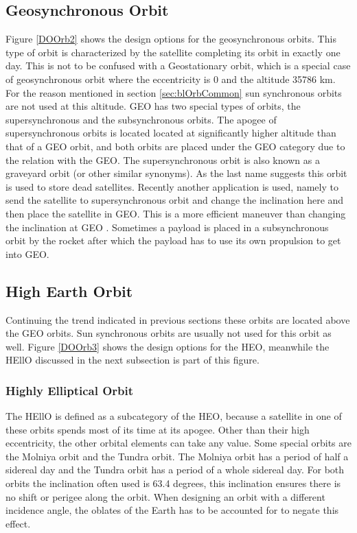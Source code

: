\subsection{Geosynchronous Orbit}
\label{sec:blOrb3}
Figure \ref{DOOrb2} shows the design options for the geosynchronous orbits.
This type of orbit is characterized by the satellite completing its orbit in exactly one day. This is not to be confused with a Geostationary orbit, which is a special case of geosynchronous orbit where the eccentricity is 0 and the altitude 35786 km.
For the reason mentioned in section \ref{sec:blOrbCommon} sun synchronous orbits are not used at this altitude. \acs{GEO} has two special types of orbits, the supersynchronous and the subsynchronous orbits. 
The apogee of supersynchronous orbits is located located at significantly higher altitude than that of a \acs{GEO} orbit, and both orbits are placed under the \acs{GEO} category due to the relation with the \acs{GEO}. The supersynchronous orbit is also known as a graveyard orbit (or other similar synonyms). As the last name suggests this orbit is used to store dead satellites. Recently another application is used, namely to send the satellite to supersynchronous orbit and change the inclination here and then place the satellite in \acs{GEO}. This is a more efficient maneuver than changing the inclination at \acs{GEO} \cite{jerOrbit}. 
Sometimes a payload is placed in a subsynchronous orbit by the rocket after which the payload has to use its own propulsion to get into \acs{GEO}.

\subsection{High Earth Orbit}
\label{sec:blOrb4}
Continuing the trend indicated in previous sections these orbits are located above the \acs{GEO} orbits. Sun synchronous orbits are usually not used for this orbit as well. 
Figure \ref{DOOrb3} shows the design options for the \ac{HEO}, meanwhile the \acs{HEllO} discussed in the next subsection is part of this figure.

\subsubsection{Highly Elliptical Orbit}
\label{sec:blOrb4.5}
The \ac{HEllO} is defined as a subcategory of the \acs{HEO}, because a satellite in one of these orbits spends most of its time at its apogee. Other than their high eccentricity, the other orbital elements can take any value. Some special orbits are the Molniya orbit and the Tundra orbit. The Molniya orbit has a period of half a sidereal day and the Tundra orbit has a period of a whole sidereal day. For both orbits the inclination often used is 63.4 degrees, this inclination ensures there is no shift or perigee along the orbit. When designing an orbit with a different incidence angle, the oblates of the Earth has to be accounted for to negate this effect.
